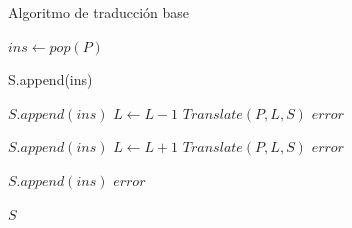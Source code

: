 \newpage
\begin{algorithm}
    \caption{Algoritmo de traducci\'on base}\label{euclid}
    \begin{algorithmic}[1]
    \State $ins \gets pop(P)$

    \State S.append(ins)
    \EndIf

            \State $S.append(\textit{ins})$
            \State $L \gets L-1$
            \State $Translate(P, L, S)$
        \Else
            \State \Return $error$
        \EndIf
    \EndIf
    
            \State $S.append(\textit{ins})$
            \State $L \gets L+1$
            \State $Translate(P, L, S)$
        \Else
            \State \Return $error$
        \EndIf
    \EndIf

            \State $S.append(\textit{ins})$
        \Else
            \State \Return $error$
        \EndIf
    \EndIf

    \State {}
    \State \Return $S$
    \EndProcedure
    \end{algorithmic}
    \end{algorithm}
    




    

\newpage